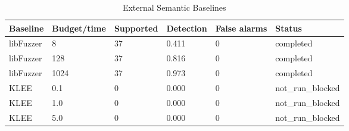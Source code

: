 \begin{table}[t]
\centering
\small
\begin{tabular}{llllll}
\toprule
Baseline & Budget/time & Supported & Detection & False alarms & Status \\
\midrule
libFuzzer & 8 & 37 & 0.411 & 0 & completed \\
libFuzzer & 128 & 37 & 0.816 & 0 & completed \\
libFuzzer & 1024 & 37 & 0.973 & 0 & completed \\
KLEE & 0.1 & 0 & 0.000 & 0 & not\_run\_blocked \\
KLEE & 1.0 & 0 & 0.000 & 0 & not\_run\_blocked \\
KLEE & 5.0 & 0 & 0.000 & 0 & not\_run\_blocked \\
\bottomrule
\end{tabular}
\caption{External Semantic Baselines}
\end{table}
